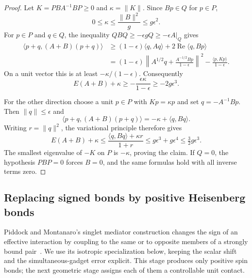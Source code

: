 \begin{proof}
Let $K=PBA^{-1}BP\geq0$ and $\kappa=\lVert K\rVert$.
Since $Bp\in Q$ for $p\in P$,
\begin{equation}\label{eq:second-order-size}
 0\leq\kappa\leq\frac{\lVert B\rVert^2}{g}
                  \leq g\epsilon^2.
\end{equation}
For $p\in P$ and $q\in Q$, the inequality
$QBQ\geq-\epsilon gQ\geq-\epsilon A|_Q$ gives
\begin{align*}
 \langle p+q,(A+B)(p+q)\rangle
 &\geq (1-\epsilon)\langle q,Aq\rangle
       +2\operatorname{Re}\langle q,Bp\rangle\\
 &= (1-\epsilon)
    \left\|A^{1/2}q+\frac{A^{-1/2}Bp}{1-\epsilon}\right\|^2
       -\frac{\langle p,Kp\rangle}{1-\epsilon}.
\end{align*}
On a unit vector this is at least $-\kappa/(1-\epsilon)$.
Consequently
\[
 E(A+B)+\kappa
 \geq-\frac{\epsilon\kappa}{1-\epsilon}
 \geq-2g\epsilon^3.
\]

For the other direction choose a unit $p\in P$ with $Kp=\kappa p$
and set $q=-A^{-1}Bp$.  Then $\lVert q\rVert\leq\epsilon$ and
\[
 \langle p+q,(A+B)(p+q)\rangle
       =-\kappa+\langle q,Bq\rangle.
\]
Writing $r=\lVert q\rVert^2$, the variational principle therefore gives
\[
 E(A+B)+\kappa
 \leq \frac{\langle q,Bq\rangle+\kappa r}{1+r}
 \leq g\epsilon^3+g\epsilon^4
 \leq\tfrac32g\epsilon^3.
\]
The smallest eigenvalue of $-K$ on $P$ is $-\kappa$, proving the
claim.  If $Q=0$, the hypothesis $PBP=0$ forces $B=0$, and the same
formulas hold with all inverse terms zero.
\end{proof}

\subsection{Replacing signed bonds by positive Heisenberg bonds}

Piddock and Montanaro's singlet mediator construction changes the sign of
an effective interaction by coupling to the same or to opposite members
of a strongly bound pair~\cite[Section~2.4 and Lemma~5]{PiddockMontanaro2017}.
We use its isotropic specialization below, keeping the scalar shift and
the simultaneous-gadget error explicit. This stage produces only positive
spin bonds; the next geometric stage assigns each of them a controllable
unit contact.

